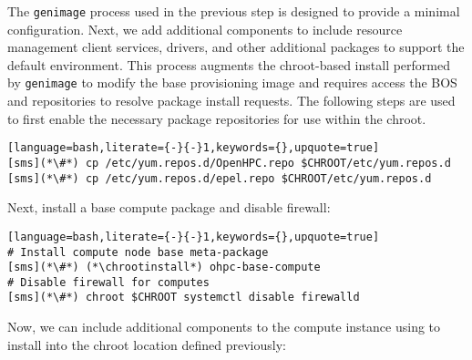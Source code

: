 
The \texttt{genimage} process used in the previous step is designed to provide a minimal \baseOS{} configuration. Next,
we add additional components to include resource management client services, \InfiniBand{} drivers, and other additional
packages to support the default \OHPC{} environment. This process augments the chroot-based install performed by
\texttt{genimage} to modify the base provisioning image and requires access the BOS and \OHPC{} repositories to resolve
package install requests. The following steps are used to first enable the necessary package repositories for use within
the chroot.

\begin{lstlisting}[language=bash,literate={-}{-}1,keywords={},upquote=true]
[sms](*\#*) cp /etc/yum.repos.d/OpenHPC.repo $CHROOT/etc/yum.repos.d
[sms](*\#*) cp /etc/yum.repos.d/epel.repo $CHROOT/etc/yum.repos.d
\end{lstlisting}

\noindent Next, install a base compute package and disable firewall:
\begin{lstlisting}[language=bash,literate={-}{-}1,keywords={},upquote=true]
# Install compute node base meta-package
[sms](*\#*) (*\chrootinstall*) ohpc-base-compute
# Disable firewall for computes
[sms](*\#*) chroot $CHROOT systemctl disable firewalld
\end{lstlisting}

\noindent Now, we can include additional components to the compute instance using
\texttt{\pkgmgr{}} to install into the chroot location defined previously:
